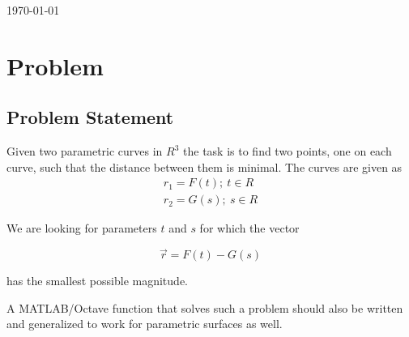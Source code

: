 \documentclass[A4]{article}
\begin{document}
\begin{titlepage}
	
	\vfill\vfill\vfill %
	
	{\large\today} %
	
	
	 
	
	\vfill %
	
\end{titlepage}
\tableofcontents
\newpage

\section{Problem}

\subsection{Problem Statement}

Given two parametric curves in $R^3$ the task is to find two points, one on each curve, such that the distance between them is minimal.
The curves are given as
\begin{equation}
\begin{aligned} r_{1} = F(t); \ t \in R \\ r_{2} = G(s); \ s \in R \end{aligned}
\end{equation}

We are looking for parameters $t$ and $s$ for which the vector

\begin{equation}
\vec{r} = F(t) - G(s)
\end{equation}

has the smallest possible magnitude.

A MATLAB/Octave function that solves such a problem should also be written and generalized to work for parametric surfaces as well.
\end{document}
